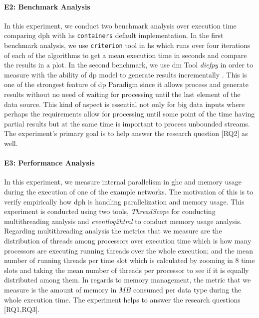\documentclass[preprint]{elsarticle}
\begin{document}
\paragraph{E2: Benchmark Analysis}
In this experiment, we conduct two benchmark analysis over execution time comparing \acrshort{dph} with \acrshort{hs} \texttt{containers} default implementation. In the first benchmark analysis, we use \texttt{criterion} \cite{criterion} tool in \acrshort{hs} which runs over four iterations of each of the algorithms to get a mean execution time in seconds and compare the results in a plot. In the second benchmark, we use \acrfull{dm} Tool \emph{diefpy} \cite{diefpy} in order to measure with the ability of \acrshort{dp} model to generate results incrementally \cite{diefpaper}. This is one of the strongest feature of \acrshort{dp} Paradigm since it allows process and generate results without no need of waiting for processing until the last element of the data source. This kind of aspect is essential not only for big data inputs where perhaps the requirements allow for processing until some point of the time having partial results but at the same time is important to process unbounded streams. The experiment's primary goal is to help answer the research question [RQ2] as well.

\paragraph{E3: Performance Analysis}
In this experiment, we measure internal parallelism in \acrshort{ghc} and memory usage during the execution of one of the example networks. The motivation of this is to verify empirically how \acrshort{dph} is handling parallelization and memory usage. This experiment is conducted using two tools, \textit{ThreadScope} \cite{threadscope} for conducting multithreading analysis and \textit{eventlog2html} \cite{eventlog2html} to conduct memory usage analysis. Regarding multithreading analysis the metrics that we measure are the distribution of threads among processors over execution time which is how many processors are executing running threads over the whole execution; and the mean number of running threads per time slot which is calculated by zooming in $8$ time slots and taking the mean number of threads per processor to see if it is equally distributed among them. In regards to memory management, the metric that we measure is the amount of memory in $MB$ consumed per data type during the whole execution time. The experiment helps to answer the research questions [RQ1,RQ3].
\end{document}
